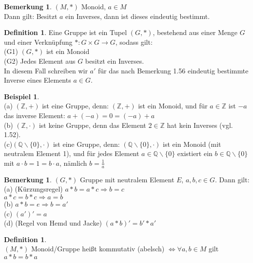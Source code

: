\documentclass[10pt,a4paper,numbers=endperiod]{scrartcl}
\theoremstyle{definition}
\newtheorem{defi}[satz]{Definition}
\newtheorem{bem}[satz]{Bemerkung}
\newtheorem{bsp}[satz]{Beispiel}
\begin{document}
\begin{bem}
	$(M,*)$ Monoid, $a \in M$\\
	Dann gilt: Besitzt $a$ ein Inverses, dann ist dieses eindeutig bestimmt.
\end{bem}

\begin{defi}
	Eine Gruppe ist ein Tupel $(G,*)$, bestehend aus einer Menge $G$ und einer Verknüpfung $*: G \times G \rightarrow G$, sodass gilt:\\
	(G1) $(G,*)$ ist ein Monoid\\
	(G2) Jedes Element aus $G$ besitzt ein Inverses.\\
	In diesem Fall schreiben wir $a'$ für das nach Bemerkung 1.56 eindeutig bestimmte Inverse eines Elements $a \in G$.\\
\end{defi}

\begin{bsp}
	$ $ \\
	(a) $(\mathbb{Z}, +)$ ist eine Gruppe, denn: $(\mathbb{Z}, +)$ ist ein Monoid, und für $a \in \mathbb{Z}$ ist $-a$ das inverse Element: $a+(-a)=0=(-a)+a$\\
	(b) $(\mathbb{Z}, \cdot)$ ist keine Gruppe, denn das Element $2 \in \mathbb{Z}$ hat kein Inverses (vgl. 1.52).\\
	(c)$(\mathbb{Q} \backslash \{0\}, \cdot)$ ist eine Gruppe, denn: $(\mathbb{Q} \backslash \{0\}, \cdot)$ ist ein Monoid (mit neutralem Element 1), und für jedes Element $a \in \mathbb{Q} \backslash\{0\}$ existiert ein $b \in \mathbb{Q} \backslash \{0\}$ mit $a \cdot b = 1 = b \cdot a$, nämlich $b = \frac{1}{a}$
\end{bsp}

\begin{bem}
	$(G, *)$ Gruppe mit neutralem Element $E$, $a,b,c \in G$. Dann gilt: \\
	(a) (Kürzungsregel) $a*b = a*c \Rightarrow b =c$\\
	\hspace*{27,5mm} $a*c = b*c \Rightarrow a = b$\\
	(b) $a*b=e \Rightarrow b=a'$\\
	(c) $(a')' = a$\\
	(d) (Regel von Hemd und Jacke) $(a*b)'=b'*a'$
\end{bem}

\begin{defi}
	$ $ \\
	$(M,*)$ Monoid/Gruppe heißt kommutativ (abelsch) $\Leftrightarrow \forall a,b \in M$ gilt $a * b = b*a$
\end{defi}
\end{document}
